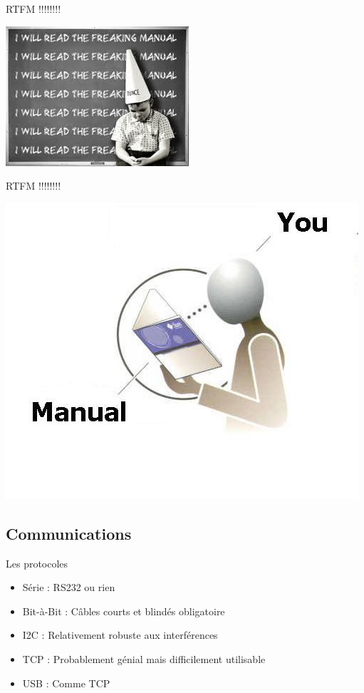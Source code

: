 \documentclass{beamer}
\begin{document}
\begin{frame}{RTFM !!!!!!!!}
	\begin{center}
		\includegraphics{rtfm03.jpg}
	\end{center}
\end{frame}
\begin{frame}{RTFM !!!!!!!!}
	\begin{center}
		\includegraphics[scale=0.5]{rtfm04.jpg}
	\end{center}
\end{frame}

\subsection{Communications}
\begin{frame}{Les protocoles}
	\begin{itemize}
		\item Série : RS232 ou rien
		\item Bit-à-Bit : Câbles courts et blindés obligatoire
		\item I2C : Relativement robuste aux interférences
		\item TCP : Probablement génial mais difficilement utilisable
		\item USB : Comme TCP
	\end{itemize}
\end{frame}
\end{document}
